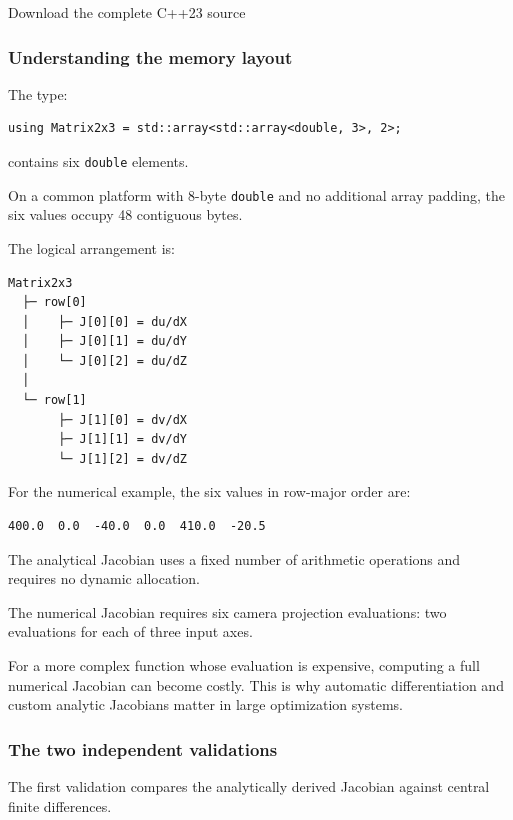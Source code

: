 Download the complete C++23 source

\subsubsection{Understanding the memory layout}\label{02-foundations-ii-ch021-understanding-the-memory-layout}

The type:

\begin{verbatim}
using Matrix2x3 = std::array<std::array<double, 3>, 2>;
\end{verbatim}

contains six \texttt{double} elements.

On a common platform with 8-byte \texttt{double} and no additional array padding, the six values occupy 48 contiguous bytes.

The logical arrangement is:

\begin{verbatim}
Matrix2x3
  ├─ row[0]
  │    ├─ J[0][0] = du/dX
  │    ├─ J[0][1] = du/dY
  │    └─ J[0][2] = du/dZ
  │
  └─ row[1]
       ├─ J[1][0] = dv/dX
       ├─ J[1][1] = dv/dY
       └─ J[1][2] = dv/dZ
\end{verbatim}

For the numerical example, the six values in row-major order are:

\begin{verbatim}
400.0  0.0  -40.0  0.0  410.0  -20.5
\end{verbatim}

The analytical Jacobian uses a fixed number of arithmetic operations and requires no dynamic allocation.

The numerical Jacobian requires six camera projection evaluations: two evaluations for each of three input axes.

For a more complex function whose evaluation is expensive, computing a full numerical Jacobian can become costly. This is why automatic differentiation and custom analytic Jacobians matter in large optimization systems.

\subsubsection{The two independent validations}\label{02-foundations-ii-ch021-the-two-independent-validations}

The first validation compares the analytically derived Jacobian against central finite differences.

